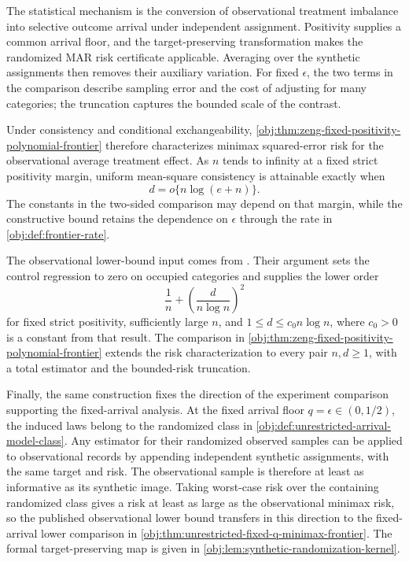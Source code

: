 The statistical mechanism is the conversion of observational treatment imbalance into selective outcome arrival under independent assignment. Positivity supplies a common arrival floor, and the target-preserving transformation makes the randomized MAR risk certificate applicable. Averaging over the synthetic assignments then removes their auxiliary variation. For fixed \(\epsilon\), the two terms in the comparison describe sampling error and the cost of adjusting for many categories; the truncation captures the bounded scale of the contrast.

Under consistency and conditional exchangeability, \cref{obj:thm:zeng-fixed-positivity-polynomial-frontier} therefore characterizes minimax squared-error risk for the observational average treatment effect. As \(n\) tends to infinity at a fixed strict positivity margin, uniform mean-square consistency is attainable exactly when
\[
d=o\{n\log(e+n)\}.
\]
The constants in the two-sided comparison may depend on that margin, while the constructive bound retains the dependence on \(\epsilon\) through the rate in \cref{obj:def:frontier-rate}.

The observational lower-bound input comes from \citet[Theorem~2, Section~3.2, p.~9, together with its proof in Section~C.5, pp.~39--44]{ZengBalakrishnanHanKennedy2026}. Their argument sets the control regression to zero on occupied categories and supplies the lower order
\[
\frac1n+\left(\frac{d}{n\log n}\right)^2
\]
for fixed strict positivity, sufficiently large \(n\), and \(1\le d\le c_0n\log n\), where \(c_0>0\) is a constant from that result. The comparison in \cref{obj:thm:zeng-fixed-positivity-polynomial-frontier} extends the risk characterization to every pair \(n,d\ge1\), with a total estimator and the bounded-risk truncation.

Finally, the same construction fixes the direction of the experiment comparison supporting the fixed-arrival analysis. At the fixed arrival floor \(q=\epsilon\in(0,1/2)\), the induced laws belong to the randomized class in \cref{obj:def:unrestricted-arrival-model-class}. Any estimator for their randomized observed samples can be applied to observational records by appending independent synthetic assignments, with the same target and risk. The observational sample is therefore at least as informative as its synthetic image. Taking worst-case risk over the containing randomized class gives a risk at least as large as the observational minimax risk, so the published observational lower bound transfers in this direction to the fixed-arrival lower comparison in \cref{obj:thm:unrestricted-fixed-q-minimax-frontier}. The formal target-preserving map is given in \cref{obj:lem:synthetic-randomization-kernel}.
